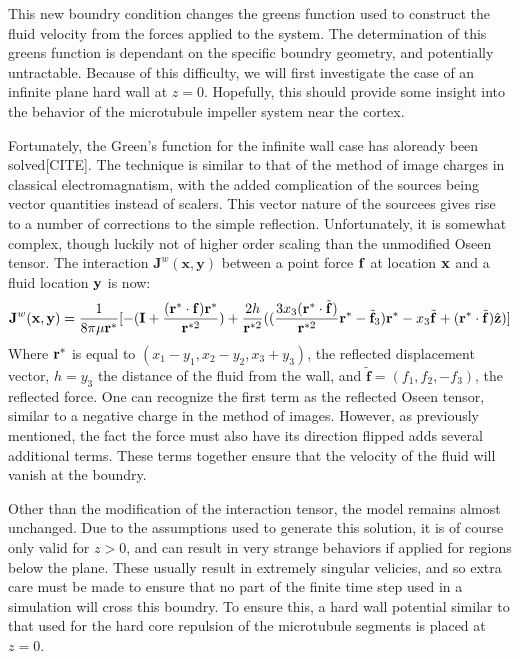 \documentclass[11pt]{ucthesis}
\def\br{{\bf r}}
\begin{document}
This new boundry condition changes the greens function used to construct the fluid velocity from the forces applied to the system. The determination of this greens function is dependant on the specific boundry geometry, and potentially untractable.
Because of this difficulty, we will first investigate the case of an infinite plane hard wall at $z=0$. Hopefully, this should provide some insight into the behavior of the microtubule impeller system near the cortex.

Fortunately, the Green's function for the infinite wall case has aloready been solved[CITE]. The technique is  similar to that of the method of image charges in classical electromagnatism, with the added complication of the sources being vector quantities instead of scalers. This vector nature of the sourcees gives rise to a number of corrections to the simple reflection.
Unfortunately, it is somewhat complex, though luckily not of higher order scaling than the unmodified Oseen tensor. The interaction $\mathbf{J}^w(\mathbf{x},\mathbf{y})$ between a point force $\bf f$ at location $\bf x$ and a fluid location $\bf y$ is now:
\begin{equation}
\label{eq:oseenwall}
\mathbf{J}^w(\mathbf{x}, \mathbf{y}) = \frac{1}{8\pi\mu \br^*} [ 
- (\mathbf{I} + \frac{(\br^*\cdot\mathbf{f})\br^*}{\br^{*2}}) 
+ \frac{2 h}{\br^{*2}}( (\frac{3 x_3(\br^*\cdot\tilde{\mathbf{f}})}{\br^{*2}} \br^* - \tilde{\mathbf{f}}_3)\br^* - x_3\tilde{\mathbf{f}} + (\br^*\cdot\tilde{\mathbf{f}})\hat{\mathbf{z}})]
\end{equation}
Where $\br^*$ is equal to $(x_1-y_1,x_2-y_2,x_3+y_3)$, the reflected displacement vector, $h = y_3$ the distance of the fluid from the wall, and $\tilde{\mathbf{f}} = (f_1,f_2,-f_3)$, the reflected force. 
One can recognize the first term as the reflected Oseen tensor, similar to a negative charge in the method of images. 
However, as previously mentioned, the fact the force must also have its direction flipped adds several additional terms. These terms together ensure that the velocity of the fluid will vanish at the boundry.

Other than the modification of the interaction tensor, the model remains almost unchanged.
Due to the assumptions used to generate this solution, it is of course only valid for $z>0$, and can result in very strange behaviors if applied for regions below the plane. 
These usually result in extremely singular velicies, and so extra care must be made to ensure that no part of the finite time step used in a simulation will cross this boundry. 
To ensure this, a hard wall potential similar to that used for the hard core repulsion of the microtubule segments is placed at $z=0$.
\end{document}
